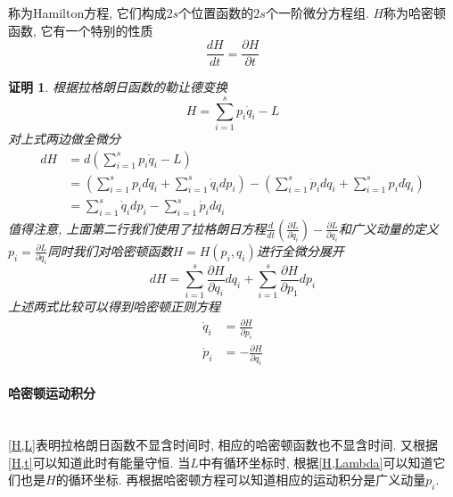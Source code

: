 \documentclass[a4paper,11pt]{article}
\theoremstyle{mystyle}
\newtheorem{Proof}{\hspace{2em}证明}[section]
\begin{document}
称为Hamilton方程, 它们构成$2s$个位置函数的$2s$个一阶微分方程组. $H$称为哈密顿函数, 它有一个特别的性质
\begin{equation*}
  \frac{dH}{dt}=\frac{\partial H}{\partial t}
\end{equation*}
\begin{Proof}
  根据拉格朗日函数的勒让德变换
  \begin{equation*}
    H=\sum_{i=1}^{s}p_i\dot{q}_i-L
  \end{equation*}
  对上式两边做全微分
  \begin{equation*}
    \begin{split}
       dH&=d\left(\sum_{i=1}^{s}p_i\dot{q}_i-L\right) \\
         &=\left(\sum_{i=1}^{s}p_id\dot{q}_i+\sum_{i=1}^{s}\dot{q}_idp_i\right)-\left(\sum_{i=1}^{s}\dot{p}_idq_i+\sum_{i=1}^{s}p_id\dot{q}_i\right)\\
         &=\sum_{i=1}^{s}\dot{q}_idp_i-\sum_{i=1}^{s}\dot{p}_idq_i
    \end{split}
  \end{equation*}
  值得注意, 上面第二行我们使用了拉格朗日方程$\frac{d}{dt}\left(\frac{\partial L}{\partial{\dot{q}_i}}\right)-\frac{\partial L}{\partial{q_i}}$和广义动量的定义$p_i=\frac{\partial L}{\partial{q}_i}$同时我们对哈密顿函数$H=H(p_i,q_i)$进行全微分展开
  \begin{equation*}
    dH=\sum_{i=1}^{s}\frac{\partial H}{\partial{q_i}}dq_i+\sum_{i=1}^{s}\frac{\partial H}{\partial{p_1}}dp_i
  \end{equation*}
  上述两式比较可以得到哈密顿正则方程
  \begin{equation*}
  \begin{split}
     \dot{q}_i&=\frac{\partial H}{\partial{p_i}} \\
     \dot{p}_i&=-\frac{\partial H}{\partial{q_i}}
  \end{split}
  \end{equation*}
\end{Proof}
\paragraph*{哈密顿运动积分}\quad\\
\eqref{H,L}表明拉格朗日函数不显含时间时, 相应的哈密顿函数也不显含时间. 又根据\eqref{H,t}可以知道此时有能量守恒. 当$L$中有循环坐标时, 根据\eqref{H,Lambda}可以知道它们也是$H$的循环坐标. 再根据哈密顿方程可以知道相应的运动积分是广义动量$p_i$.
\end{document}
